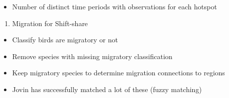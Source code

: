 \documentclass[
  letterpaper,
]{article}
\providecommand{\tightlist}{%
  \setlength{\itemsep}{0pt}\setlength{\parskip}{0pt}}\usepackage{longtable,booktabs,array}
\begin{document}
\begin{tcolorbox}
\begin{itemize}
  \begin{itemize}
  \tightlist
  \item
    Number of distinct time periods with observations for each hotspot
  \end{itemize}
\end{itemize}

\begin{enumerate}
\def\labelenumi{\arabic{enumi}.}
\setcounter{enumi}{1}
\tightlist
\item
  Migration for Shift-share
\end{enumerate}

\begin{itemize}
\tightlist
\item
  Classify birds are migratory or not
\item
  Remove species with missing migratory classification
\item
  Keep migratory species to determine migration connections to regions
\item
  Jovin has successfully matched a lot of these (fuzzy matching)
\end{itemize}

\end{tcolorbox}
\end{document}
